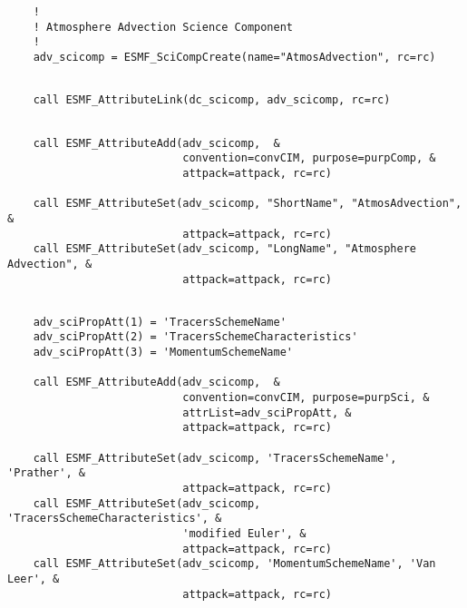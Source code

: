 
 \begin{verbatim}
    !
    ! Atmosphere Advection Science Component
    !
    adv_scicomp = ESMF_SciCompCreate(name="AtmosAdvection", rc=rc)
 
\end{verbatim}
 

 \begin{verbatim}
    call ESMF_AttributeLink(dc_scicomp, adv_scicomp, rc=rc)
 
\end{verbatim}
 

 \begin{verbatim}
    call ESMF_AttributeAdd(adv_scicomp,  &
                           convention=convCIM, purpose=purpComp, &
                           attpack=attpack, rc=rc)

    call ESMF_AttributeSet(adv_scicomp, "ShortName", "AtmosAdvection", &
                           attpack=attpack, rc=rc)
    call ESMF_AttributeSet(adv_scicomp, "LongName", "Atmosphere Advection", &
                           attpack=attpack, rc=rc)
 
\end{verbatim}
 

 \begin{verbatim}
    adv_sciPropAtt(1) = 'TracersSchemeName'
    adv_sciPropAtt(2) = 'TracersSchemeCharacteristics'
    adv_sciPropAtt(3) = 'MomentumSchemeName'

    call ESMF_AttributeAdd(adv_scicomp,  &
                           convention=convCIM, purpose=purpSci, &
                           attrList=adv_sciPropAtt, &
                           attpack=attpack, rc=rc)

    call ESMF_AttributeSet(adv_scicomp, 'TracersSchemeName', 'Prather', &
                           attpack=attpack, rc=rc)
    call ESMF_AttributeSet(adv_scicomp, 'TracersSchemeCharacteristics', &
                           'modified Euler', &
                           attpack=attpack, rc=rc)
    call ESMF_AttributeSet(adv_scicomp, 'MomentumSchemeName', 'Van Leer', &
                           attpack=attpack, rc=rc)
 
\end{verbatim}
 

